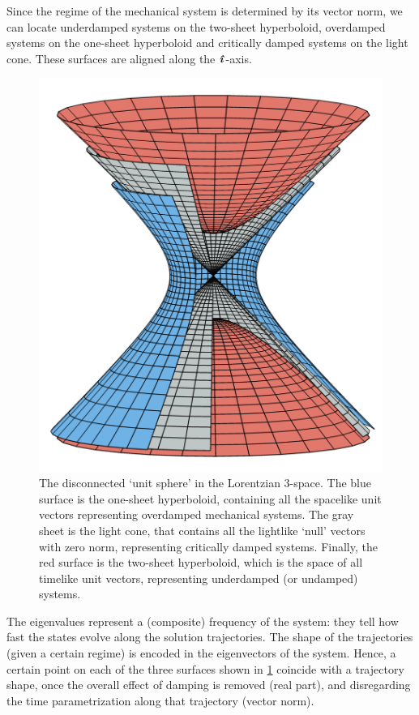 Since the regime of the mechanical system is determined by its vector norm, we can locate underdamped systems on the two-sheet hyperboloid, overdamped systems on the one-sheet hyperboloid and critically damped systems on the light cone. These surfaces are aligned along the $\quati$-axis.

\begin{figure}[ht!]
    \centering
    \includegraphics[]{media/other/lorentz_space.png}
    \caption{The disconnected `unit sphere' in the Lorentzian 3-space. The blue surface is the one-sheet hyperboloid, containing all the spacelike unit vectors representing overdamped mechanical systems. The gray sheet is the light cone, that contains all the lightlike `null' vectors with zero norm, representing critically damped systems. Finally, the red surface is the two-sheet hyperboloid, which is the space of all timelike unit vectors, representing underdamped (or undamped) systems.}
    \label{fig:hyperboloids}
\end{figure}

The eigenvalues represent a (composite) frequency of the system: they tell how fast the states evolve along the solution trajectories. The shape of the trajectories (given a certain regime) is encoded in the eigenvectors of the system. Hence, a certain point on each of the three surfaces shown in \cref{fig:hyperboloids} coincide with a trajectory shape, once the overall effect of damping is removed (real part), and disregarding the time parametrization along that trajectory (vector norm).

